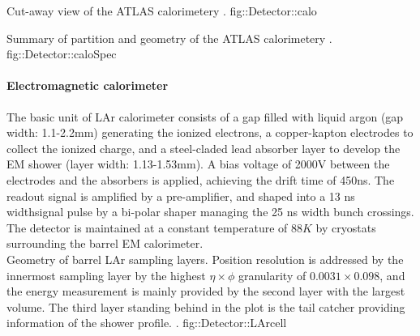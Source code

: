 {Cut-away view of the ATLAS calorimetery \cite{ATLAS_exp}.}
{fig::Detector::calo}

\clearpage
{}
{Summary of partition and geometry of the ATLAS calorimetery \cite{ATLAS_TDR}.}
{fig::Detector::caloSpec}
\clearpage


\paragraph{Electromagnetic calorimeter}
%
The basic unit of LAr calorimeter consists of a gap filled with liquid argon (gap width: 1.1-2.2mm) generating the ionized electrons, a copper-kapton electrodes to collect the ionized charge, 
and a steel-claded lead absorber layer to develop the EM shower (layer width: 1.13-1.53mm). A bias voltage of 2000V between the electrodes and the absorbers is applied, achieving the drift time of 450ns. The readout signal is amplified by a pre-amplifier, and shaped into a 13 ns widthsignal pulse by a bi-polar shaper managing the 25 ns width bunch crossings.
The detector is maintained at a constant temperature of $88K$ by cryostats surrounding the barrel EM calorimeter. \\

{Geometry of barrel LAr sampling layers. 
Position resolution is addressed by the innermost sampling layer by the highest $\eta\times\phi$ granularity of $0.0031\times0.098$,
and the energy measurement is mainly provided by the second layer with the largest volume.
The third layer standing behind in the plot is the tail catcher providing information of the shower profile.
    \cite{ATLAS_TDR}.}
{fig::Detector::LArcell}

